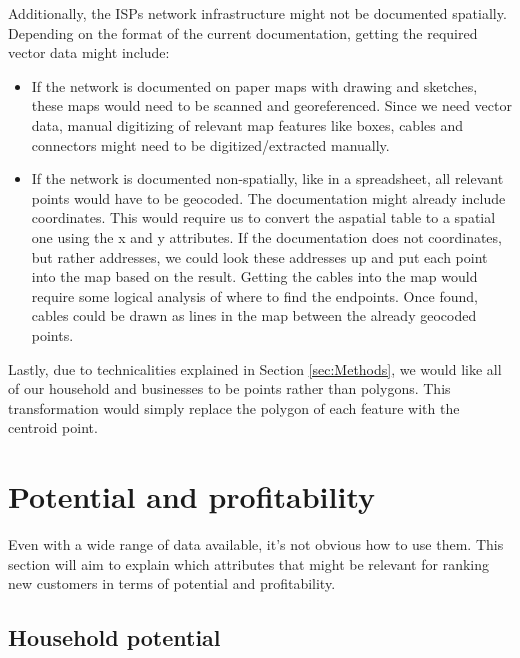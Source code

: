 \documentclass[twocolumn]{article}
\begin{document}
Additionally, the ISPs network infrastructure might not be documented spatially. Depending on the format of the current documentation, getting the required vector data might include:
\begin{itemize}
  \item If the network is documented on paper maps with drawing and sketches, these maps would need to be scanned and georeferenced. Since we need vector data, manual digitizing of relevant map features like boxes, cables and connectors might need to be digitized/extracted manually.
  \item If the network is documented non-spatially, like in a spreadsheet, all relevant points would have to be geocoded. The documentation might already include coordinates. This would require us to convert the aspatial table to a spatial one using the x and y attributes. If the documentation does not coordinates, but rather addresses, we could look these addresses up and put each point into the map based on the result. Getting the cables into the map would require some logical analysis of where to find the endpoints. Once found, cables could be drawn as lines in the map between the already geocoded points.
\end{itemize}

Lastly, due to technicalities explained in Section \ref{sec:Methods}, we would like all of our household and businesses to be points rather than polygons. This transformation would simply replace the polygon of each feature with the centroid point.


\section{Potential and profitability}
\label{sec:Potential and profitability}
Even with a wide range of data available, it's not obvious how to use them. This section will aim to explain which attributes that might be relevant for ranking new customers in terms of potential and profitability.

\subsection{Household potential}
\label{sub:Potential}
\end{document}

